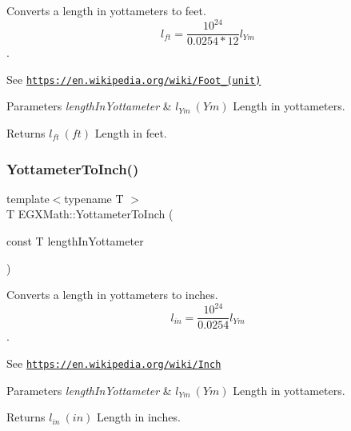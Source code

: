 Converts a length in yottameters to feet. \[ l_{ft}= \frac{10^{24}}{0.0254 * 12} l_{Ym} \]. 

See \href{https://en.wikipedia.org/wiki/Foot_(unit)}{\tt https\+://en.\+wikipedia.\+org/wiki/\+Foot\+\_\+(unit)} 
\begin{DoxyParams}{Parameters}
{\em length\+In\+Yottameter} & $ l_{Ym}\ (Ym)$ Length in yottameters. \\
\hline
\end{DoxyParams}
\begin{DoxyReturn}{Returns}
$ l_{ft}\ (ft)$ Length in feet. 
\end{DoxyReturn}
\mbox{\label{group___e_g_x_math-_conversions-_length_conversions-_yottameter-_imperial_ga6de8b1bd4812d6814328cb5d54adf08c}} 
\subsubsection{\texorpdfstring{Yottameter\+To\+Inch()}{YottameterToInch()}}
{\footnotesize\ttfamily template$<$typename T $>$ \\
T E\+G\+X\+Math\+::\+Yottameter\+To\+Inch (\begin{DoxyParamCaption}\item[{const T}]{length\+In\+Yottameter }\end{DoxyParamCaption})}



Converts a length in yottameters to inches. \[ l_{in}= \frac{10^{24}}{0.0254} l_{Ym} \]. 

See \href{https://en.wikipedia.org/wiki/Inch}{\tt https\+://en.\+wikipedia.\+org/wiki/\+Inch} 
\begin{DoxyParams}{Parameters}
{\em length\+In\+Yottameter} & $ l_{Ym}\ (Ym)$ Length in yottameters. \\
\hline
\end{DoxyParams}
\begin{DoxyReturn}{Returns}
$ l_{in}\ (in)$ Length in inches. 
\end{DoxyReturn}
\mbox{\label{group___e_g_x_math-_conversions-_length_conversions-_yottameter-_imperial_ga71ee7b2256fffaec2663bd2eafc30a9d}} 
